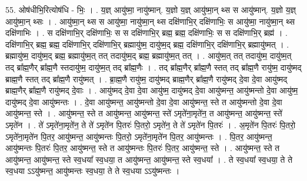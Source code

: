 \documentclass[17pt]{extarticle}
\begin{document}
55. ओष॑धीभि॒रित्योष॑धि - भिः॒ । . य॒ज्ञ् आयु॑ष्मा॒ नायु॑ष्मान्. य॒ज्ञो य॒ज्ञ् आयु॑ष्मा॒न् थ्स स आयु॑ष्मान्. य॒ज्ञो य॒ज्ञ् आयु॑ष्मा॒न् थ्सः । . आयु॑ष्मा॒न् थ्स स आयु॑ष्मा॒ नायु॑ष्मा॒न् थ्स दक्षि॑णाभि॒र् दक्षि॑णाभिः॒ स आयु॑ष्मा॒ नायु॑ष्मा॒न् थ्स दक्षि॑णाभिः । . स दक्षि॑णाभि॒र् दक्षि॑णाभिः॒ स स दक्षि॑णाभि॒र् ब्रह्म॒ ब्रह्म॒ दक्षि॑णाभिः॒ स स दक्षि॑णाभि॒र् ब्रह्म॑ । . दक्षि॑णाभि॒र् ब्रह्म॒ ब्रह्म॒ दक्षि॑णाभि॒र् दक्षि॑णाभि॒र् ब्रह्मायु॑ष्म॒ दायु॑ष्म॒द् ब्रह्म॒ दक्षि॑णाभि॒र् दक्षि॑णाभि॒र् ब्रह्मायु॑ष्मत् । . ब्रह्मायु॑ष्म॒ दायु॑ष्म॒द् ब्रह्म॒ ब्रह्मायु॑ष्म॒त् तत् तदायु॑ष्म॒द् ब्रह्म॒ ब्रह्मायु॑ष्म॒त् तत् । . आयु॑ष्म॒त् तत् तदायु॑ष्म॒ दायु॑ष्म॒त् तद् ब्रा᳚ह्म॒णैर् ब्रा᳚ह्म॒णै स्तदायु॑ष्म॒ दायु॑ष्म॒त् तद् ब्रा᳚ह्म॒णैः । . तद् ब्रा᳚ह्म॒णैर् ब्रा᳚ह्म॒णै स्तत् तद् ब्रा᳚ह्म॒णै रायु॑ष्म॒ दायु॑ष्मद् ब्राह्म॒णै स्तत् तद् ब्रा᳚ह्म॒णै रायु॑ष्मत् । . ब्रा॒ह्म॒णै रायु॑ष्म॒ दायु॑ष्मद् ब्राह्म॒णैर् ब्रा᳚ह्म॒णै रायु॑ष्मद् दे॒वा दे॒वा आयु॑ष्मद् ब्राह्म॒णैर् ब्रा᳚ह्म॒णै रायु॑ष्मद् दे॒वाः । . आयु॑ष्मद् दे॒वा दे॒वा आयु॑ष्म॒ दायु॑ष्मद् दे॒वा आयु॑ष्मन्त॒ आयु॑ष्मन्तो दे॒वा आयु॑ष्म॒ दायु॑ष्मद् दे॒वा आयु॑ष्मन्तः । . दे॒वा आयु॑ष्मन्त॒ आयु॑ष्मन्तो दे॒वा दे॒वा आयु॑ष्मन्त॒ स्ते त आयु॑ष्मन्तो दे॒वा दे॒वा आयु॑ष्मन्त॒ स्ते । . आयु॑ष्मन्त॒ स्ते त आयु॑ष्मन्त॒ आयु॑ष्मन्त॒ स्ते॑ ऽमृते॑ना॒मृते॑न॒ त आयु॑ष्मन्त॒ आयु॑ष्मन्त॒ स्ते॑ ऽमृते॑न । . ते॑ ऽमृते॑ना॒मृते॑न॒ ते ते॑ ऽमृते॑न पि॒तरः॑ पि॒तरो॒ ऽमृते॑न॒ ते ते॑ ऽमृते॑न पि॒तरः॑ । . अ॒मृते॑न पि॒तरः॑ पि॒तरो॒ ऽमृते॑ना॒मृते॑न पि॒तर॒ आयु॑ष्मन्त॒ आयु॑ष्मन्तः पि॒तरो॒ ऽमृते॑ना॒मृते॑न पि॒तर॒ आयु॑ष्मन्तः । . पि॒तर॒ आयु॑ष्मन्त॒ आयु॑ष्मन्तः पि॒तरः॑ पि॒तर॒ आयु॑ष्मन्त॒ स्ते त आयु॑ष्मन्तः पि॒तरः॑ पि॒तर॒ आयु॑ष्मन्त॒ स्ते । . आयु॑ष्मन्त॒ स्ते त आयु॑ष्मन्त॒ आयु॑ष्मन्त॒ स्ते स्व॒धया᳚ स्व॒धया॒ त आयु॑ष्मन्त॒ आयु॑ष्मन्त॒ स्ते स्व॒धया᳚ । . ते स्व॒धया᳚ स्व॒धया॒ ते ते स्व॒धया ऽऽयु॑ष्मन्त॒ आयु॑ष्मन्तः स्व॒धया॒ ते ते स्व॒धया ऽऽयु॑ष्मन्तः । \newline
\end{document}
